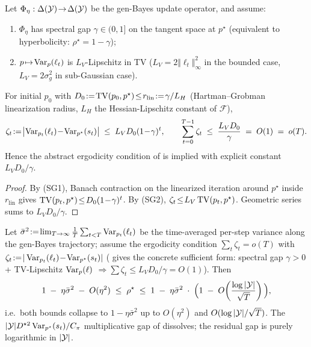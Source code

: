 \begin{lemma}
\label{lem:spectral-gap-ergodicity}
Let $\Phi_\eta:\Delta(\mathcal{Y})\!\to\!\Delta(\mathcal{Y})$ be the gen-Bayes update
operator, and assume:
\begin{enumerate}[label=\textup{(SG\arabic*)},leftmargin=*,topsep=2pt,itemsep=1pt]
\item $\Phi_\eta$ has spectral gap $\gamma\!\in\!(0,1]$ on the
tangent space at $p^\star$ (equivalent to hyperbolicity:
$\rho^\star\!=\!1\!-\!\gamma$);
\item $p\!\mapsto\!\operatorname{Var}_p(\ell_t)$ is $L_V$-Lipschitz in TV
($L_V\!=\!2\Vert\ell_t\Vert_\infty^{2}$ in the bounded case,
$L_V\!=\!2\sigma^{2}_g$ in sub-Gaussian case).
\end{enumerate}
For initial $p_0$ with $D_0\!:=\!\operatorname{TV}(p_0,p^\star)\!\le\!r_{\mathrm{lin}}\!:=\!\gamma/L_H$
(Hartman--Grobman linearization radius, $L_H$ the Hessian-Lipschitz
constant of $\mathcal{F}$),
\begin{equation}
\zeta_t\!:=\!\bigl|\operatorname{Var}_{p_t}(\ell_t)\!-\!\operatorname{Var}_{p^\star}(s_t)\bigr|
\;\le\;L_V D_0(1\!-\!\gamma)^{t},
\qquad
\sum_{t=0}^{T-1}\zeta_t\;\le\;\frac{L_V D_0}{\gamma}\;=\;O(1)\;=\;o(T).
\label{eq:ergodicity-from-spectral-gap}
\end{equation}
Hence the abstract ergodicity condition of  is
implied with explicit constant $L_V D_0/\gamma$.
\end{lemma}

\begin{proof}
By (SG1), Banach contraction on the linearized iteration around
$p^\star$ inside $r_{\mathrm{lin}}$ gives
$\operatorname{TV}(p_t,p^\star)\!\le\!D_0(1\!-\!\gamma)^{t}$.  By (SG2),
$\zeta_t\!\le\!L_V\operatorname{TV}(p_t,p^\star)$.  Geometric series sums to
$L_V D_0/\gamma$.
\end{proof}

\begin{theorem}
\label{thm:ct2-sharp}
Let $\bar\sigma^{2}\!:=\!\lim_{T\to\infty}\tfrac{1}{T}\sum_{t<T}\operatorname{Var}_{p_t}(\ell_t)$
be the time-averaged per-step variance along the gen-Bayes
trajectory; assume the ergodicity condition
$\sum_t\zeta_t\!=\!o(T)$ with
$\zeta_t\!:=\!|\operatorname{Var}_{p_t}(\ell_t)\!-\!\operatorname{Var}_{p^\star}(s_t)|$
( gives the concrete sufficient
form: spectral gap $\gamma\!>\!0$ + TV-Lipschitz $\operatorname{Var}_p(\ell)$
$\Rightarrow\sum\zeta_t\!\le\!L_VD_0/\gamma\!=\!O(1)$).  Then
\begin{equation}
1\;-\;\eta\bar\sigma^{2}\;-\;O(\eta^2)
\;\le\;\rho^\star\;\le\;
1\;-\;\eta\bar\sigma^{2}\;\cdot\;\Big(1\;-\;O\!\left(\frac{\log|\mathcal{Y}|}{\sqrt T}\right)\Big),
\label{eq:ct2-sharp}
\end{equation}
i.e.\ both bounds collapse to $1\!-\!\eta\bar\sigma^{2}$ up to
$O(\eta^2)$ and $O(\log|\mathcal{Y}|/\sqrt T)$.  The
$|\mathcal{Y}|D^{\star 2}\operatorname{Var}_{p^\star}(s_t)/C_\pi$ multiplicative gap of
 dissolves; the residual gap is
purely logarithmic in $|\mathcal{Y}|$.
\end{theorem}

